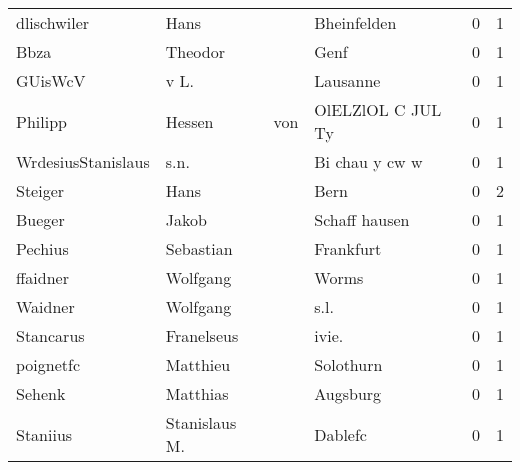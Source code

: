 \begin{tabular}{llllrr}
              dlischwiler &                               Hans &             &                                 Bheinfelden &          0 &         1 \\
                     Bbza &                            Theodor &             &                                        Genf &          0 &         1 \\
                  GUisWcV &                               v L. &             &                                    Lausanne &          0 &         1 \\
                  Philipp &                             Hessen &         von &                           OlELZlOL C JUL Ty &          0 &         1 \\
       WrdesiusStanislaus &                               s.n. &             &                              Bi chau y cw w &          0 &         1 \\
                  Steiger &                               Hans &             &                                        Bern &          0 &         2 \\
                   Bueger &                              Jakob &             &                               Schaff hausen &          0 &         1 \\
                  Pechius &                          Sebastian &             &                                   Frankfurt &          0 &         1 \\
                 ffaidner &                           Wolfgang &             &                                       Worms &          0 &         1 \\
                  Waidner &                           Wolfgang &             &                                        s.l. &          0 &         1 \\
                Stancarus &                         Franelseus &             &                                      ivie.  &          0 &         1 \\
                poignetfc &                           Matthieu &             &                                   Solothurn &          0 &         1 \\
                   Sehenk &                           Matthias &             &                                    Augsburg &          0 &         1 \\
                 Staniius &                      Stanislaus M. &             &                                     Dablefc &          0 &         1 \\

\end{tabular}
